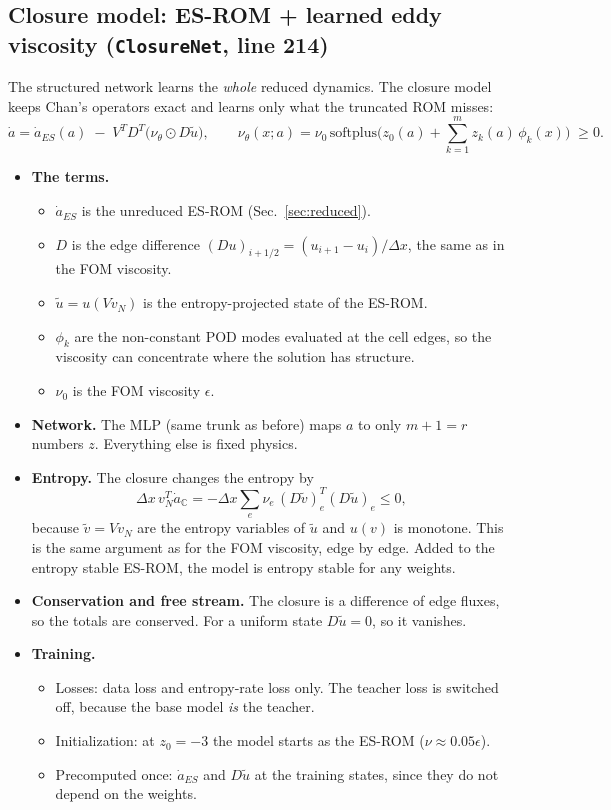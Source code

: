 \documentclass[11pt,a4paper]{article}
\newcommand{\code}[1]{\texttt{\small #1}}
\begin{document}
\subsection{Closure model: ES-ROM + learned eddy viscosity (\code{ClosureNet}, line 214)}\label{sec:closure}
The structured network learns the \emph{whole} reduced dynamics. The closure model keeps Chan's operators exact and learns only what the truncated ROM misses:
\begin{equation}\label{eq:closure}
\dot a=\dot a_{ES}(a)\;-\;V^TD^T\big(\nu_\theta\odot D\tilde u\big),\qquad
\nu_\theta(x;a)=\nu_0\,\mathrm{softplus}\Big(z_0(a)+\textstyle\sum_{k=1}^{m}z_k(a)\,\phi_k(x)\Big)\;\ge0 .
\end{equation}
\begin{itemize}
\item \textbf{The terms.}
  \begin{itemize}
  \item $\dot a_{ES}$ is the unreduced ES-ROM (Sec.~\ref{sec:reduced}).
  \item $D$ is the edge difference $(D u)_{i+1/2}=(u_{i+1}-u_i)/\Delta x$, the same as in the FOM viscosity.
  \item $\tilde u=u(Vv_N)$ is the entropy-projected state of the ES-ROM.
  \item $\phi_k$ are the non-constant POD modes evaluated at the cell edges, so the viscosity can concentrate where the solution has structure.
  \item $\nu_0$ is the FOM viscosity $\epsilon$.
  \end{itemize}
\item \textbf{Network.} The MLP (same trunk as before) maps $a$ to only $m+1=r$ numbers $z$. Everything else is fixed physics.
\item \textbf{Entropy.} The closure changes the entropy by
\[ \Delta x\,v_N^T\dot a_{\mathbb C}=-\Delta x\sum_e\nu_e\,(D\tilde v)_e^T(D\tilde u)_e\le0, \]
because $\tilde v=Vv_N$ are the entropy variables of $\tilde u$ and $u(v)$ is monotone. This is the same argument as for the FOM viscosity, edge by edge. Added to the entropy stable ES-ROM, the model is entropy stable for any weights.
\item \textbf{Conservation and free stream.} The closure is a difference of edge fluxes, so the totals are conserved. For a uniform state $D\tilde u=0$, so it vanishes.
\item \textbf{Training.}
  \begin{itemize}
  \item Losses: data loss and entropy-rate loss only. The teacher loss is switched off, because the base model \emph{is} the teacher.
  \item Initialization: at $z_0=-3$ the model starts as the ES-ROM ($\nu\approx0.05\epsilon$).
  \item Precomputed once: $\dot a_{ES}$ and $D\tilde u$ at the training states, since they do not depend on the weights.
  \end{itemize}
\end{itemize}
\end{document}
